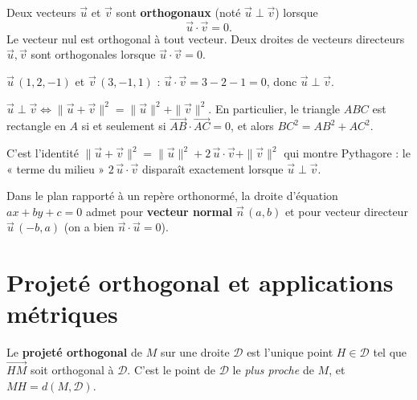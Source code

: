 \begin{definition}
Deux vecteurs $\vec u$ et $\vec v$ sont \textbf{orthogonaux} (noté $\vec u\perp\vec v$) lorsque
\[
\vec u\cdot\vec v=0.
\]
Le vecteur nul est orthogonal à tout vecteur. Deux droites de vecteurs directeurs
$\vec u,\vec v$ sont orthogonales lorsque $\vec u\cdot\vec v=0$.
\end{definition}

\begin{exemple}
$\vec u\,(1,2,-1)$ et $\vec v\,(3,-1,1)$ : $\vec u\cdot\vec v=3-2-1=0$, donc $\vec u\perp\vec v$.
\end{exemple}

\begin{theoreme}
$\vec u\perp\vec v\iff\|\vec u+\vec v\|^{2}=\|\vec u\|^{2}+\|\vec v\|^{2}$.
En particulier, le triangle $ABC$ est rectangle en $A$ si et seulement si
$\overrightarrow{AB}\cdot\overrightarrow{AC}=0$, et alors $BC^{2}=AB^{2}+AC^{2}$.
\end{theoreme}

\begin{remarque}
C'est l'identité $\|\vec u+\vec v\|^{2}=\|\vec u\|^{2}+2\,\vec u\cdot\vec v+\|\vec v\|^{2}$
qui montre Pythagore : le « terme du milieu » $2\,\vec u\cdot\vec v$ disparaît exactement
lorsque $\vec u\perp\vec v$.
\end{remarque}

\begin{propriete}
Dans le plan rapporté à un repère orthonormé, la droite d'équation $ax+by+c=0$
admet pour \textbf{vecteur normal} $\vec n\,(a,b)$ et pour vecteur directeur $\vec u\,(-b,a)$
(on a bien $\vec n\cdot\vec u=0$).
\end{propriete}

\section{Projeté orthogonal et applications métriques}

\begin{definition}
Le \textbf{projeté orthogonal} de $M$ sur une droite $\mathcal D$ est l'unique point $H\in\mathcal D$
tel que $\overrightarrow{HM}$ soit orthogonal à $\mathcal D$. C'est le point de $\mathcal D$
le \emph{plus proche} de $M$, et $MH=d(M,\mathcal D)$.
\end{definition}

